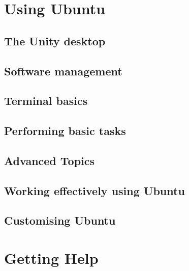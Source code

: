 \documentclass[10pt,a4paper,oneside,final,titlepage]{book}
\begin{document}
\part{Using Ubuntu}

\chapter{The Unity desktop} \label{chap:unity}


\chapter{Software management} \label{chap:software_management}


\chapter{Terminal basics} \label{chap:terminal}


\chapter{Performing basic tasks}


\chapter{Advanced Topics}


\chapter{Working effectively using Ubuntu}


\chapter{Customising Ubuntu} \label{chap:customise-ubuntu} 



\part{Getting Help}
\end{document}
